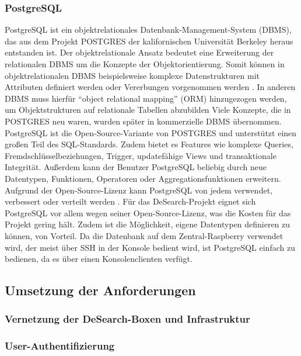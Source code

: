 \subsubsection{PostgreSQL}
PostgreSQL ist ein objektrelationales Datenbank-Management-System (DBMS), das aus dem Projekt POSTGRES der kalifornischen Universität Berkeley heraus entstanden ist. Der objektrelationale Ansatz bedeutet eine Erweiterung der relationalen DBMS um die Konzepte der Objektorientierung. Somit können in objektrelationalen DBMS beispielsweise komplexe Datenstrukturen mit Attributen definiert werden oder Vererbungen vorgenommen werden \citep[Vgl.][S. 135f.]{datenbanken}. In anderen DBMS muss hierfür \enquote{object relational mapping} (ORM) hinzugezogen werden, um Objektstrukturen auf relationale Tabellen abzubilden \citep[Vgl.][S. 426]{balzert} Viele Konzepte, die in POSTGRES neu waren, wurden später in kommerzielle DBMS übernommen. PostgreSQL ist die Open-Source-Variante von POSTGRES und unterstützt einen großen Teil des SQL-Standards. Zudem bietet es Features wie komplexe Queries, Fremdschlüsselbeziehungen, Trigger, updatefähige Views und transaktionale Integrität. Außerdem kann der Benutzer PostgreSQL beliebig durch neue Datentypen, Funktionen, Operatoren oder Aggregationsfunktionen erweitern. Aufgrund der Open-Source-Lizenz kann PostgreSQL von jedem verwendet, verbessert oder verteilt werden
\citep[Vgl.][preface, S. lxvi]{postgres}. Für das DeSearch-Projekt eignet sich PostgreSQL vor allem wegen seiner Open-Source-Lizenz, was die Kosten für das Projekt gering hält. Zudem ist die Möglichkeit, eigene Datentypen definieren zu können, von Vorteil. Da die Datenbank auf dem Zentral-Raspberry verwendet wird, der meist über SSH in der Konsole bedient wird, ist PostgreSQL einfach zu bedienen, da es über einen Konsolenclienten verfügt.

\subsection{Umsetzung der Anforderungen}

\subsubsection{Vernetzung der DeSearch-Boxen und Infrastruktur}
\subsubsection{User-Authentifizierung}
